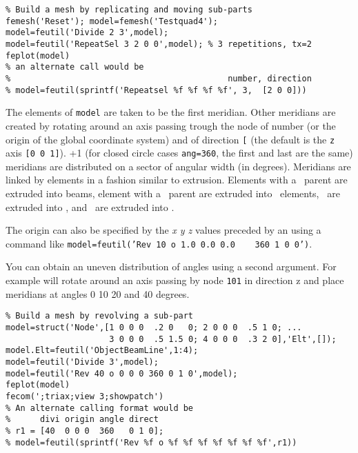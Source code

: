 \begin{verbatim}
% Build a mesh by replicating and moving sub-parts
femesh('Reset'); model=femesh('Testquad4');
model=feutil('Divide 2 3',model); 
model=feutil('RepeatSel 3 2 0 0',model); % 3 repetitions, tx=2
feplot(model)
% an alternate call would be
%                                            number, direction
% model=feutil(sprintf('Repeatsel %f %f %f %f', 3,  [2 0 0]))
\end{verbatim}%


 The elements of {\tt model} are taken to be the first meridian. Other meridians are created by rotating around an axis passing trough the node of number  (or the origin of the global coordinate system) and of direction {\tt [}\tsi{nx ny nz}{\tt ]} (the default is the {\tt z} axis {\tt [0 0 1]}). +1 (for closed circle cases {\tt ang=360}, the first and last are the same) meridians are distributed on a sector of angular width  (in degrees). Meridians are linked by elements in a fashion similar to extrusion. Elements with a \mass\ parent are extruded into beams, element with a \beam\ parent are extruded into \quada\ elements, \quada\ are extruded into \hexah, and \quadb\ are extruded into \hexav.

The origin can also be specified by the {\sl x y z }values preceded by an  using a command like {\tt model=feutil('Rev 10 o 1.0 0.0 0.0 \ \ \ 360 1 0 0')}.

You can obtain an uneven distribution of angles using a second argument. For example  will rotate around an axis passing by node {\tt 101} in direction {\ti z} and place meridians at angles 0 10 20 and 40 degrees. 

\begin{verbatim}
% Build a mesh by revolving a sub-part
model=struct('Node',[1 0 0 0  .2 0   0; 2 0 0 0  .5 1 0; ...  
                     3 0 0 0  .5 1.5 0; 4 0 0 0  .3 2 0],'Elt',[]);
model.Elt=feutil('ObjectBeamLine',1:4);
model=feutil('Divide 3',model);
model=feutil('Rev 40 o 0 0 0 360 0 1 0',model);
feplot(model)
fecom(';triax;view 3;showpatch')
% An alternate calling format would be
%      divi origin angle direct
% r1 = [40  0 0 0  360   0 1 0];
% model=feutil(sprintf('Rev %f o %f %f %f %f %f %f %f',r1))
\end{verbatim}%



